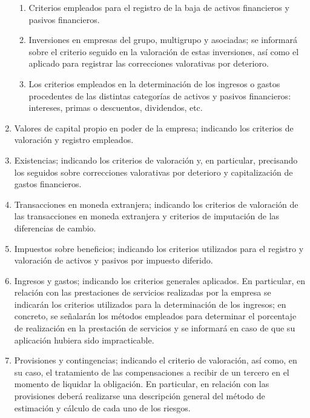 \documentclass[11pt,a4paper]{article}
\begin{document}
\begin{enumerate}
\begin{enumerate}
    \item Criterios empleados para el registro de la baja de activos financieros y pasivos financieros.

    \item Inversiones en empresas del grupo, multigrupo y asociadas; se informará sobre el criterio seguido en la valoración de estas inversiones, así como el aplicado para registrar las correcciones valorativas por deterioro.

    \item Los criterios empleados en la determinación de los ingresos o gastos procedentes de las distintas categorías de activos y pasivos financieros: intereses, primas o descuentos, dividendos, etc.

   \end{enumerate}

\item Valores de capital propio en poder de la empresa; indicando los criterios de valoración y registro empleados.

\item Existencias; indicando los criterios de valoración y, en particular, precisando los seguidos sobre correcciones valorativas por deterioro y capitalización de gastos financieros.

\item Transacciones en moneda extranjera; indicando los criterios de valoración de las transacciones en moneda extranjera y criterios de imputación de las diferencias de cambio.

\item Impuestos sobre beneficios; indicando los criterios utilizados para el registro y valoración de activos y pasivos por impuesto diferido.

\item Ingresos y gastos; indicando los criterios generales aplicados. En particular, en relación con las prestaciones de servicios realizadas por la empresa se indicarán los criterios utilizados para la determinación de los ingresos; en concreto, se señalarán los métodos empleados para determinar el porcentaje de realización en la prestación de servicios y se informará en caso de que su aplicación hubiera sido impracticable.

\item Provisiones y contingencias; indicando el criterio de valoración, así como, en su caso, el tratamiento de las compensaciones a recibir de un tercero en el momento de liquidar la obligación. En particular, en relación con las provisiones deberá realizarse una descripción general del método de estimación y cálculo de cada uno de los riesgos.


\end{enumerate}
\end{document}
